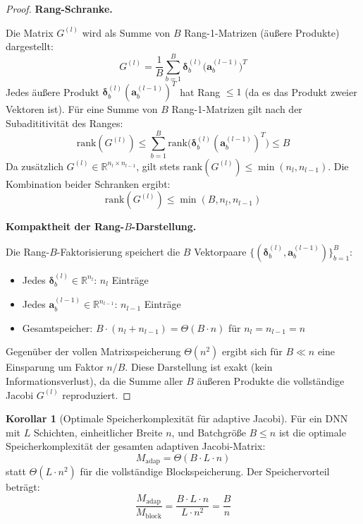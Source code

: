﻿\documentclass[a4paper,12pt]{article}
\theoremstyle{definition}
\newtheorem{korollar}{Korollar}
\begin{document}
\begin{proof}
	\textbf{Rang-Schranke.}
	
	Die Matrix $G^{(l)}$ wird als Summe von $B$ Rang-1-Matrizen (äußere Produkte) dargestellt:
	\[
	G^{(l)} = \frac{1}{B} \sum_{b=1}^B \boldsymbol{\delta}^{(l)}_b \bigl(\boldsymbol{a}^{(l-1)}_b\bigr)^T
	\]
	Jedes äußere Produkt $\boldsymbol{\delta}^{(l)}_b (\boldsymbol{a}^{(l-1)}_b)^T$ hat Rang $\leq 1$ (da es das Produkt zweier Vektoren ist). Für eine Summe von $B$ Rang-1-Matrizen gilt nach der Subadititivität des Ranges:
	\[
	\mathrm{rank}(G^{(l)}) \leq \sum_{b=1}^B \mathrm{rank}\bigl(\boldsymbol{\delta}^{(l)}_b (\boldsymbol{a}^{(l-1)}_b)^T\bigr) \leq B
	\]
	Da zusätzlich $G^{(l)} \in \mathbb{R}^{n_l \times n_{l-1}}$, gilt stets $\mathrm{rank}(G^{(l)}) \leq \min(n_l, n_{l-1})$. Die Kombination beider Schranken ergibt:
	\[
	\mathrm{rank}(G^{(l)}) \leq \min(B, n_l, n_{l-1})
	\]
	
	\textbf{Kompaktheit der Rang-$B$-Darstellung.}
	
	Die Rang-$B$-Faktorisierung speichert die $B$ Vektorpaare $\{(\boldsymbol{\delta}^{(l)}_b, \boldsymbol{a}^{(l-1)}_b)\}_{b=1}^B$:
	\begin{itemize}
		\item Jedes $\boldsymbol{\delta}^{(l)}_b \in \mathbb{R}^{n_l}$: $n_l$ Einträge
		\item Jedes $\boldsymbol{a}^{(l-1)}_b \in \mathbb{R}^{n_{l-1}}$: $n_{l-1}$ Einträge
		\item Gesamtspeicher: $B \cdot (n_l + n_{l-1}) = \Theta(B \cdot n)$ für $n_l = n_{l-1} = n$
	\end{itemize}
	Gegenüber der vollen Matrixspeicherung $\Theta(n^2)$ ergibt sich für $B \ll n$ eine Einsparung um Faktor $n/B$. Diese Darstellung ist exakt (kein Informationsverlust), da die Summe aller $B$ äußeren Produkte die vollständige Jacobi $G^{(l)}$ reproduziert.
\end{proof}

\begin{korollar}[Optimale Speicherkomplexität für adaptive Jacobi]
	\label{cor:memory}
	Für ein DNN mit $L$ Schichten, einheitlicher Breite $n$, und Batchgröße $B \leq n$ ist die optimale Speicherkomplexität der gesamten adaptiven Jacobi-Matrix:
	\[
	M_{\mathrm{adap}} = \Theta(B \cdot L \cdot n)
	\]
	statt $\Theta(L \cdot n^2)$ für die vollständige Blockspeicherung. Der Speichervorteil beträgt:
	\[
	\frac{M_{\mathrm{adap}}}{M_{\mathrm{block}}} = \frac{B \cdot L \cdot n}{L \cdot n^2} = \frac{B}{n}
	\]
\end{korollar}
\end{document}
